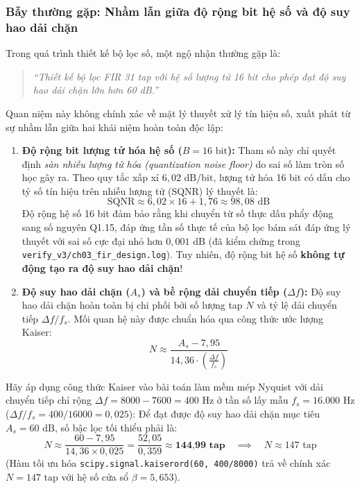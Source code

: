\subsubsection*{Bẫy thường gặp: Nhầm lẫn giữa độ rộng bit hệ số và độ suy hao dải chặn}
Trong quá trình thiết kế bộ lọc số, một ngộ nhận thường gặp là:
\begin{quote}
\emph{``Thiết kế bộ lọc FIR 31 tap với hệ số lượng tử 16 bit cho phép đạt độ suy hao dải chặn lớn hơn 60 dB.''}
\end{quote}
Quan niệm này không chính xác về mặt lý thuyết xử lý tín hiệu số, xuất phát từ sự nhầm lẫn giữa hai khái niệm hoàn toàn độc lập:
\begin{enumerate}[leftmargin=1.5em, itemsep=3pt]
    \item \textbf{Độ rộng bit lượng tử hóa hệ số ($B = 16\text{ bit}$):} Tham số này chỉ quyết định \emph{sàn nhiễu lượng tử hóa (quantization noise floor)} do sai số làm tròn số học gây ra. Theo quy tắc xấp xỉ $6{,}02\text{ dB/bit}$, lượng tử hóa 16 bit có dấu cho tỷ số tín hiệu trên nhiễu lượng tử (SQNR) lý thuyết là:
    \begin{equation}
    \text{SQNR} \approx 6{,}02 \times 16 + 1{,}76 \approx 98{,}08\text{ dB}
    \end{equation}
    Độ rộng hệ số 16 bit đảm bảo rằng khi chuyển từ số thực dấu phẩy động sang số nguyên Q1.15, đáp ứng tần số thực tế của bộ lọc bám sát đáp ứng lý thuyết với sai số cực đại nhỏ hơn $0{,}001\text{ dB}$ (đã kiểm chứng trong \texttt{verify\_v3/ch03\_fir\_design.log}). Tuy nhiên, độ rộng bit hệ số \textbf{không tự động tạo ra độ suy hao dải chặn}!
    \item \textbf{Độ suy hao dải chặn ($A_s$) và bề rộng dải chuyển tiếp ($\Delta f$):} Độ suy hao dải chặn hoàn toàn bị chi phối bởi số lượng tap $N$ và tỷ lệ dải chuyển tiếp $\Delta f / f_s$. Mối quan hệ này được chuẩn hóa qua công thức ước lượng Kaiser:
    \begin{equation}
    N \approx \frac{A_s - 7{,}95}{14{,}36 \cdot \left(\frac{\Delta f}{f_s}\right)}
    \end{equation}
\end{enumerate}

Hãy áp dụng công thức Kaiser vào bài toán làm mềm mép Nyquist với dải chuyển tiếp chỉ rộng $\Delta f = 8000 - 7600 = 400\text{ Hz}$ ở tần số lấy mẫu $f_s = 16.000\text{ Hz}$ ($\Delta f / f_s = 400 / 16000 = 0{,}025$):
Để đạt được độ suy hao dải chặn mục tiêu $A_s = 60\text{ dB}$, số bậc lọc tối thiểu phải là:
\begin{equation}
N \approx \frac{60 - 7{,}95}{14{,}36 \times 0{,}025} = \frac{52{,}05}{0{,}359} \approx \textbf{144{,}99 tap} \quad \implies \quad N \approx 147\text{ tap}
\end{equation}
(Hàm tối ưu hóa \texttt{scipy.signal.kaiserord(60, 400/8000)} trả về chính xác $N = 147\text{ tap}$ với hệ số cửa sổ $\beta = 5{,}653$).


